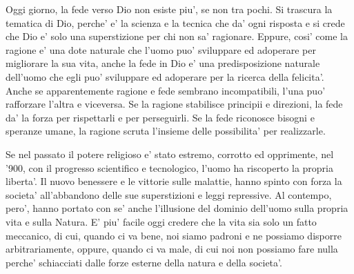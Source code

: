Oggi giorno, la fede verso Dio non esiste piu', se non tra pochi. Si trascura la tematica di Dio, perche' e' la scienza e la tecnica che da' ogni risposta e si crede che Dio e' solo una superstizione per chi non sa' ragionare. Eppure, cosi' come la ragione e' una dote naturale che l'uomo puo' sviluppare ed adoperare per migliorare la sua vita, anche la fede in Dio e' una predisposizione naturale dell'uomo che egli puo' sviluppare ed adoperare per la ricerca della felicita'. Anche se apparentemente ragione e fede sembrano incompatibili, l'una puo' rafforzare l'altra e viceversa. Se la ragione stabilisce principii e direzioni, la fede da' la forza per rispettarli e per perseguirli. Se la fede riconosce bisogni e speranze umane, la ragione scruta l'insieme delle possibilita' per realizzarle.


Se nel passato il potere religioso e' stato estremo, corrotto ed opprimente, nel '900, con il progresso scientifico e tecnologico, l'uomo ha riscoperto la propria liberta'. Il nuovo benessere e le vittorie sulle malattie, hanno spinto con forza la societa' all'abbandono delle sue superstizioni e leggi repressive. Al contempo, pero', hanno portato con se' anche l'illusione del dominio dell'uomo sulla propria vita e sulla Natura. E' piu' facile oggi credere che la vita sia solo un fatto meccanico, di cui, quando ci va bene, noi siamo padroni e ne possiamo disporre arbitrariamente, oppure, quando ci va male, di cui noi non possiamo fare nulla perche' schiacciati dalle forze esterne della natura e della societa'. 

